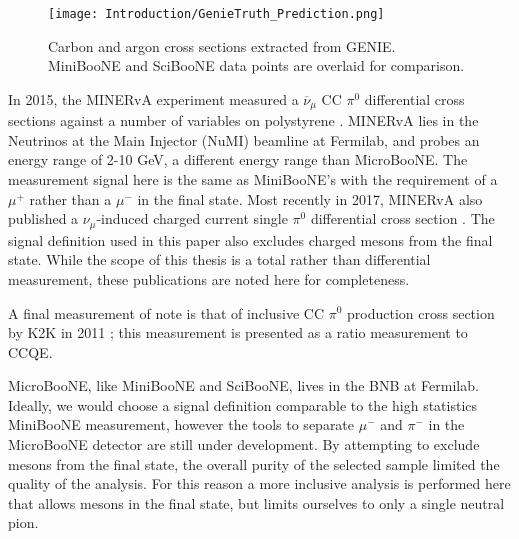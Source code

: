 \begin{figure}[H]
\centering
\texttt{[image: Introduction/GenieTruth\_Prediction.png]}
\caption{ Carbon and argon cross sections extracted from GENIE. MiniBooNE and SciBooNE data points are overlaid for comparison. }
\label{fig:genie_extracted_xsec}
\end{figure}

\par In 2015, the MINERvA experiment measured a $\overline{\nu}_\mu$ CC $\pi^0$ differential cross sections against a number of variables on polystyrene \cite{bib:minerva_thesis} \cite{bib:minerva_paper}.  MINERvA lies in the Neutrinos at the Main Injector (NuMI) beamline at Fermilab, and probes an energy range of 2-10 GeV, a different energy range than MicroBooNE.  The measurement signal here is the same as MiniBooNE's with the requirement of a $\mu^+$ rather than a $\mu^-$ in the final state. Most recently in 2017, MINERvA also published a $\nu_\mu$-induced charged current single $\pi^0$ differential cross section \cite{bib:minerva_paper_2017}.  The signal definition used in this paper also excludes charged mesons from the final state. While the scope of this thesis is a total rather than differential measurement, these publications are noted here for completeness. 
\par A final measurement of note is that of inclusive CC $\pi^0$ production cross section by K2K in 2011 \cite{bib:k2k_paper}; this measurement is presented as a ratio measurement to CCQE.  
\par MicroBooNE, like MiniBooNE and SciBooNE, lives in the BNB at Fermilab. Ideally, we would choose a signal definition comparable to the high statistics MiniBooNE measurement, however the tools to separate $\mu^-$ and $\pi^-$ in the MicroBooNE detector are still under development. By attempting to exclude mesons from the final state, the overall purity of the selected sample limited the quality of the analysis. For this reason a more inclusive analysis is performed here that allows mesons in the final state, but limits ourselves to only a single neutral pion. 

